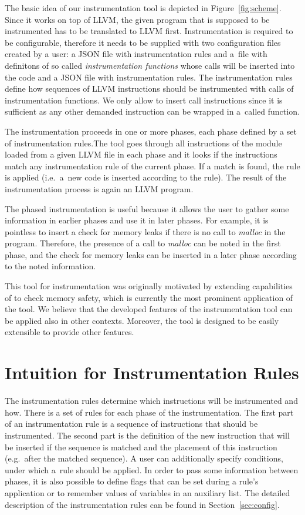 The basic idea of our instrumentation tool is depicted in
Figure~\ref{fig:scheme}. Since it works on top of LLVM, the given program that
is supposed to be instrumented has to be translated to LLVM first.
Instrumentation is required to be configurable, therefore it needs to be
supplied with two configuration files created by a user: a JSON file with
instrumentation rules and a~file with definitons of so called
\emph{instrumentation functions} whose calls will be inserted into the code and
a JSON file with instrumentation rules. The instrumentation rules define how
sequences of LLVM instructions should be instrumented with calls of
instrumentation functions.  We only allow to insert call instructions since it
is sufficient as any other demanded instruction can be wrapped in a~called
function.

The instrumentation proceeds in one or more phases, each phase defined by a set
of instrumentation rules.The tool goes through all instructions of the module
loaded from a given LLVM file in each phase and it looks if the instructions
match any instrumentation rule of the current phase. If a match is found, the
rule is applied (i.e.~a~new code is inserted according to the rule). The result
of the instrumentation process is again an LLVM program.

The phased instrumentation is useful because it allows the user to gather some
information in earlier phases and use it in later phases. For example, it is
pointless to insert a check for memory leaks if there is no call to
\emph{malloc} in the program. Therefore, the presence of a call to
\emph{malloc} can be noted in the first phase, and the check for memory leaks
can be inserted in a later phase according to the noted information.

This tool for instrumentation was originally motivated by extending
capabilities of \symbiotic to check memory safety, which is currently the most
prominent application of the tool. We believe that the developed features of
the instrumentation tool can be applied also in other contexts. Moreover, the
tool is designed to be easily extensible to provide other features.


\section{Intuition for Instrumentation Rules}
The instrumentation rules determine which instructions will be instrumented and
how. There is a set of rules for each phase of the instrumentation. The first
part of an instrumentation rule is a sequence of instructions that should be
instrumented. The second part is the definition of the new instruction that
will be inserted if the sequence is matched and the placement of this
instruction (e.g.~after the matched sequence). A user can additionally specify
conditions, under which a~rule should be applied. In order to pass some
information between phases, it is also possible to define flags that can be set
during a rule's application or to remember values of variables in an auxiliary
list. The detailed description of the instrumentation rules can be found in
Section~\ref{sec:config}.

